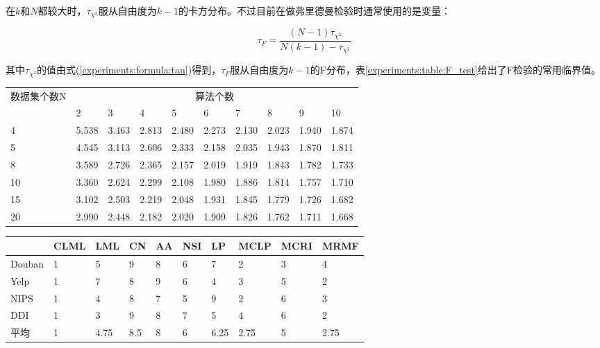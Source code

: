 在$k$和$N$都较大时，$\tau_{\chi^2}$服从自由度为$k-1$的卡方分布。不过目前在做弗里德曼检验时通常使用的是变量：

\begin{equation}
    \tau_F=\frac{(N-1)\tau_{\chi^2}}{N(k-1)-\tau_{\chi^2}} 
    \label{experiments:formula:tauF}
\end{equation}
    
其中$\tau_{\chi^2}$的值由式(\ref{experiments:formula:tau})得到，$\tau_F$服从自由度为$k-1$的F分布，表\ref{experiments:table:F_test}给出了F检验的常用临界值。

\begin{center}
    \begin{tabular}{|p{2.5cm}<{\centering}|p{1cm}<{\centering}p{1cm}<{\centering}p{1cm}<{\centering}p{1cm}<{\centering}p{1cm}<{\centering}p{1cm}<{\centering}p{1cm}<{\centering}p{1cm}<{\centering}p{1.5cm}<{\centering}|} \hline
        \multirow{2}{*}{数据集个数N} & \multicolumn{9}{c|}{算法个数} \\ \cline{2-10}
         & 2 & 3 & 4 & 5 & 6 & 7 & 8 & 9 & 10 \\ \hline
        4 & 5.538 & 3.463 & 2.813 & 2.480 & 2.273 & 2.130 & 2.023 & 1.940 & 1.874 \\
        5 & 4.545 & 3.113 & 2.606 & 2.333 & 2.158 & 2.035 & 1.943 & 1.870 & 1.811 \\
        8 & 3.589 & 2.726 & 2.365 & 2.157 & 2.019 & 1.919 & 1.843 & 1.782 & 1.733 \\
        10 & 3.360 & 2.624 & 2.299 & 2.108 & 1.980 & 1.886 & 1.814 & 1.757 & 1.710 \\
        15 & 3.102 & 2.503 & 2.219 & 2.048 & 1.931 & 1.845 & 1.779 & 1.726 & 1.682 \\
        20 & 2.990 & 2.448 & 2.182 & 2.020 & 1.909 & 1.826 & 1.762 & 1.711 & 1.668 \\ \hline
    \end{tabular}
    \label{experiments:table:F_test}
\end{center}


\begin{center}
    \begin{tabular}{|p{2.5cm}<{\centering}|p{1cm}<{\centering}p{1cm}<{\centering}p{1cm}<{\centering}p{1cm}<{\centering}p{1cm}<{\centering}p{1cm}<{\centering}p{1cm}<{\centering}p{1cm}<{\centering}p{1.5cm}<{\centering}|} \hline
           & CLML & LML & CN & AA & NSI & LP & MCLP & MCRI & MRMF \\ \hline
        Douban & 1 & 5 & 9 & 8 & 6 & 7 & 2 & 3 & 4 \\
        Yelp & 1 & 7 & 8 & 9 & 6 & 4 & 3 & 5 & 2 \\
        NIPS & 1 & 4 & 8 & 7 & 5 & 9 & 2 & 6 & 3 \\
        DDI  & 1 & 3 & 9 & 8 & 7 & 5 & 4 & 6 & 2 \\ \hline
        平均 & 1 & 4.75 & 8.5 & 8 & 6 & 6.25 & 2.75 & 5 & 2.75 \\ \hline
    \end{tabular}
    \label{experiments:table:rank}
\end{center}


